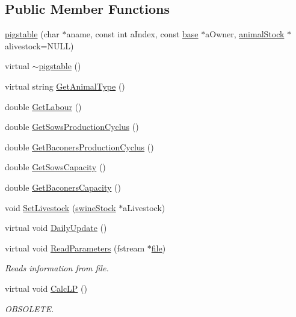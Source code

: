 \subsection*{Public Member Functions}
\begin{DoxyCompactItemize}
\item 
\hyperlink{classpigstable_a364d33fa370fb478387009b95dae4cea}{pigstable} (char $\ast$aname, const int aIndex, const \hyperlink{classbase}{base} $\ast$aOwner, \hyperlink{classanimal_stock}{animalStock} $\ast$alivestock=NULL)
\item 
virtual \hyperlink{classpigstable_a938464fcff82c03e1597eda101754d8e}{$\sim$pigstable} ()
\item 
virtual string \hyperlink{classpigstable_af4e59e6d7864795569365be2ccdd2d6b}{GetAnimalType} ()
\item 
double \hyperlink{classpigstable_ac14a3ded55664bd4c44841044e787d15}{GetLabour} ()
\item 
double \hyperlink{classpigstable_a66c14d2be32d4dba34a32ece913a3073}{GetSowsProductionCyclus} ()
\item 
double \hyperlink{classpigstable_a68a621406eb37f6ec5c701da6a08573a}{GetBaconersProductionCyclus} ()
\item 
double \hyperlink{classpigstable_aabcb52218fd513e64a754db978910ac5}{GetSowsCapacity} ()
\item 
double \hyperlink{classpigstable_a44362a0d046f2c41ac1603e953b8f471}{GetBaconersCapacity} ()
\item 
void \hyperlink{classpigstable_a9ad970c3d281c92caea8010ac353bbd1}{SetLivestock} (\hyperlink{classswine_stock}{swineStock} $\ast$aLivestock)
\item 
virtual void \hyperlink{classpigstable_a971c427391124e56a4374ace16c461df}{DailyUpdate} ()
\item 
virtual void \hyperlink{classpigstable_a97e3706555a93da782e5418df532078c}{ReadParameters} (fstream $\ast$\hyperlink{classbase_a3af52ee9891719d09b8b19b42450b6f6}{file})
\begin{DoxyCompactList}\small\item\em Reads information from file. \item\end{DoxyCompactList}\item 
virtual void \hyperlink{classpigstable_a9e56606838c623a05cb2f6e0b721cc47}{CalcLP} ()
\begin{DoxyCompactList}\small\item\em OBSOLETE. \item\end{DoxyCompactList}\item 

\end{DoxyCompactItemize}
